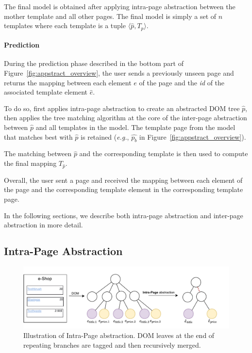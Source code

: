 The final model is obtained after applying intra-page abstraction between the mother template and all other pages.
The final model is simply a set of $n$ templates where each template is a tuple $\langle \hat{p}, T_{p} \rangle$.

\paragraph{Prediction}
During the prediction phase described in the bottom part of Figure~\ref{fig:appstract_overview}, the user sends a previously unseen page and \textsc{\appstract{}} returns the mapping between each element $e$ of the page and the \textit{id} of the associated template element $\hat{e}$.

To do so, \textsc{\appstract{}} first applies intra-page abstraction to create an abstracted DOM tree $\hat{p}$, then applies the tree matching algorithm at the core of the inter-page abstraction between $\hat{p}$ and all templates in the model.
The template page from the model that matches best with $\hat{p}$ is retained (\emph{e.g.}, $\hat{p_b}$ in Figure~\ref{fig:appstract_overview}).

The matching between $\hat{p}$ and the corresponding template is then used to compute the final mapping $T_{\hat{p}}$.

Overall, the user sent a page and received the mapping between each element of the page and the corresponding template element in the corresponding template page.

In the following sections, we describe both intra-page abstraction and inter-page abstraction in more detail.

\subsection{Intra-Page Abstraction}

\begin{figure}[ht]
  \centering
  \includegraphics[width=0.8\linewidth]{appstract/explanations/intra}
  \caption{Illustration of Intra-Page abstraction. DOM leaves at the end of repeating branches are tagged and then recursively merged.}
  \label{fig:intra}
\end{figure}

